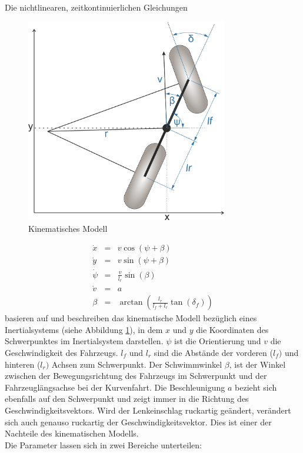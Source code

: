 \documentclass{like}
\begin{document}
Die nichtlinearen, zeitkontinuierlichen Gleichungen 

\begin{figure}[ht!]
	\centering
	\includegraphics[width=250pt]{Abbildungen/kinBicycle.png}
	\caption{Kinematisches Modell}
	\label{fig:kinmodel}
\end{figure}

\begin{eqnarray}
\label{eq:kinDiscrete}
\dot{x}   &= &v  \cos(\psi + \beta)\\
\dot{y}   &= &v  \sin(\psi + \beta)\\
\dot{\psi} &= &\frac{v}{l_r} \sin(\beta) \\
\dot{v}    &= &a \\
\beta      &= &\arctan \left( \frac{l_r}{l_f + l_r} \tan(\delta_f) \right) \label{compute_beta}
\end{eqnarray}
basieren auf \cite{rajamani2011vehicle, 7225830} und beschreiben das kinematische Modell bezüglich eines Inertialsystems (siehe Abbildung \ref{fig:kinmodel}), in dem \(x\) und \(y\) die Koordinaten des Schwerpunktes im Inertialsystem darstellen. 
\(\psi\) ist die Orientierung und \(v\) die Geschwindigkeit des Fahrzeugs. \(l_f\) und \(l_r\) sind die Abstände der vorderen (\(l_f)\) und hinteren (\(l_r)\) Achsen zum Schwerpunkt.
Der Schwimmwinkel \(\beta\), ist der Winkel  zwischen der Bewegungsrichtung des Fahrzeugs im Schwerpunkt und der Fahrzeuglängsachse bei der Kurvenfahrt. Die Beschleunigung \(a\) bezieht sich ebenfalls auf den Schwerpunkt und zeigt immer in die Richtung des Geschwindigkeitsvektors. Wird der Lenkeinschlag ruckartig geändert, verändert sich auch genauso ruckartig der Geschwindigkeitsvektor. Dies ist einer der Nachteile des kinematischen Modells.\\
Die Parameter lassen sich in zwei Bereiche unterteilen:
\end{document}
